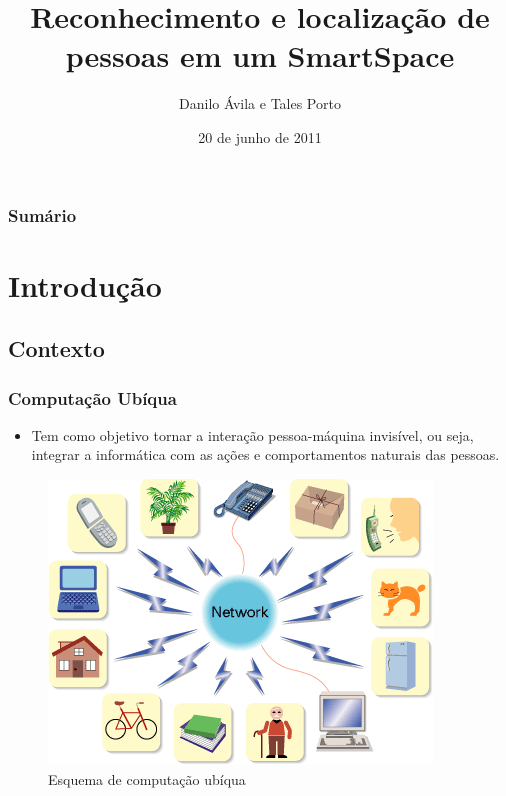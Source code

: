 \documentclass{beamer}
\title{Reconhecimento e localização de pessoas em um SmartSpace}
\author{Danilo Ávila e  Tales Porto}
\institute[UnB]
{
    Departamento de Ciência da Computação\\
    Instituto de Ciências Exatas\\
    Universidade de Brasília
}
\date{20 de junho de 2011}
\begin{document}
\begin{frame}
\titlepage
\end{frame}


\begin{frame}
	\frametitle{Sumário}
	\tableofcontents
\end{frame}


\section{Introdução}

\subsection{Contexto}

\begin{frame}
    \frametitle{Computação Ubíqua}

	\begin{itemize}
  		\item Tem como objetivo tornar a interação pessoa-máquina invisível, ou seja, integrar a informática com as ações e comportamentos naturais das pessoas.
	\end{itemize}

    \begin{figure}[h]
    	\centering \includegraphics[scale=0.9]{figuras/ubiquitous.gif}
    	\caption{Esquema de computação ubíqua}
	\label{esquema_computacao_ubiqua} 
    \end{figure}
\end{frame}
\end{document}
